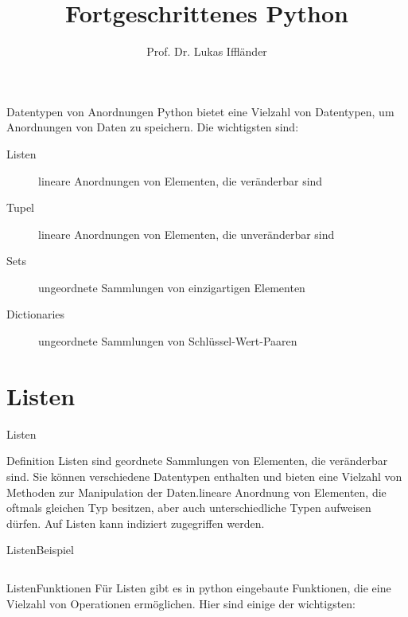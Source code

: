 \documentclass[xelatex,aspectratio=169]{beamer}
\title{Fortgeschrittenes Python}
\author{Prof. Dr. Lukas Iffländer}
\institute{HTW Dresden}
\date{}
\begin{document}
\begin{frame}
    \titlepage
\end{frame}

\begin{frame}{Datentypen von Anordnungen}
    Python bietet eine Vielzahl von Datentypen, um Anordnungen von Daten zu speichern. Die wichtigsten sind:
    \begin{description}
        \item[Listen] lineare Anordnungen von Elementen, die veränderbar sind
        \item[Tupel] lineare Anordnungen von Elementen, die unveränderbar sind
        \item[Sets] ungeordnete Sammlungen von einzigartigen Elementen
        \item[Dictionaries] ungeordnete Sammlungen von Schlüssel-Wert-Paaren
    \end{description}
\end{frame}

\section{Listen}

\begin{frame}{Listen}
    \begin{block}{Definition}
        Listen sind geordnete Sammlungen von Elementen, die veränderbar sind. Sie können verschiedene Datentypen enthalten und bieten eine Vielzahl von Methoden zur Manipulation der Daten.lineare Anordnung von Elementen, die oftmals gleichen Typ besitzen, aber auch unterschiedliche Typen aufweisen dürfen.
        Auf Listen kann indiziert zugegriffen werden.
    \end{block}
\end{frame}

\begin{frame}{Listen}{Beispiel}
    \inputminted{python}{src/listen_overview.py}
\end{frame}

\begin{frame}{Listen}{Funktionen}
    Für Listen gibt es in python eingebaute Funktionen, die eine Vielzahl von Operationen ermöglichen. Hier sind einige der wichtigsten:
    \inputminted{python}{src/listen_funktionen.py}
\end{frame}
\end{document}
